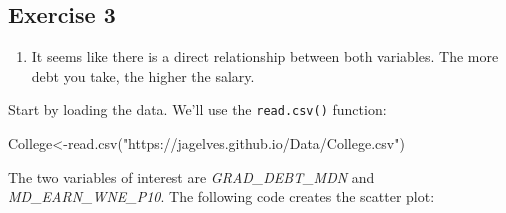 \documentclass[
  letterpaper,
  DIV=11,
  numbers=noendperiod]{scrreprt}
\newenvironment{Shaded}{\begin{snugshade}}{\end{snugshade}}
\newcommand{\AttributeTok}[1]{\textcolor[rgb]{0.40,0.45,0.13}{#1}}
\newcommand{\ConstantTok}[1]{\textcolor[rgb]{0.56,0.35,0.01}{#1}}
\newcommand{\DecValTok}[1]{\textcolor[rgb]{0.68,0.00,0.00}{#1}}
\newcommand{\FunctionTok}[1]{\textcolor[rgb]{0.28,0.35,0.67}{#1}}
\newcommand{\NormalTok}[1]{\textcolor[rgb]{0.00,0.23,0.31}{#1}}
\newcommand{\OtherTok}[1]{\textcolor[rgb]{0.00,0.23,0.31}{#1}}
\newcommand{\SpecialCharTok}[1]{\textcolor[rgb]{0.37,0.37,0.37}{#1}}
\newcommand{\StringTok}[1]{\textcolor[rgb]{0.13,0.47,0.30}{#1}}
\providecommand{\tightlist}{%
  \setlength{\itemsep}{0pt}\setlength{\parskip}{0pt}}\usepackage{longtable,booktabs,array}
\begin{document}
\hypertarget{exercise-3-11}{%
\subsection*{Exercise 3}\label{exercise-3-11}}

\begin{blackbox}

\begin{enumerate}
\def\labelenumi{\arabic{enumi}.}
\tightlist
\item
  It seems like there is a direct relationship between both variables.
  The more debt you take, the higher the salary.
\end{enumerate}

\end{blackbox}

Start by loading the data. We'll use the \texttt{read.csv()} function:

\begin{Shaded}
\begin{Highlighting}[numbers=left,,]
\NormalTok{College}\OtherTok{\textless{}{-}}\FunctionTok{read.csv}\NormalTok{(}\StringTok{"https://jagelves.github.io/Data/College.csv"}\NormalTok{)}
\end{Highlighting}
\end{Shaded}

The two variables of interest are \emph{GRAD\_DEBT\_MDN} and
\emph{MD\_EARN\_WNE\_P10}. The following code creates the scatter plot:

\begin{Shaded}
\end{Shaded}
\end{document}
